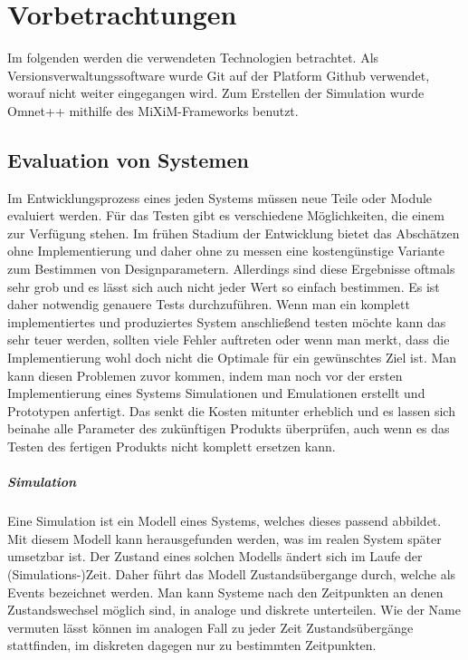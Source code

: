 \chapter{Vorbetrachtungen}

Im folgenden werden die verwendeten Technologien betrachtet. Als Versionsverwaltungssoftware wurde Git\cite{git} auf der Platform Github\cite{github} verwendet, worauf nicht weiter eingegangen wird. Zum Erstellen der Simulation wurde Omnet++\cite{omnet} mithilfe des MiXiM-Frameworks\cite{mixim} benutzt.

\section{Evaluation von Systemen}

Im Entwicklungsprozess eines jeden Systems müssen neue Teile oder Module evaluiert werden. Für das Testen gibt es verschiedene Möglichkeiten, die einem zur Verfügung stehen. Im frühen Stadium der Entwicklung bietet das Abschätzen ohne Implementierung und daher ohne zu messen eine kostengünstige Variante zum Bestimmen von Designparametern. Allerdings sind diese Ergebnisse oftmals sehr grob und es lässt sich auch nicht jeder Wert so einfach bestimmen. \newline
Es ist daher notwendig genauere Tests durchzuführen. Wenn man ein komplett implementiertes und produziertes System anschließend testen möchte kann das sehr teuer werden, sollten viele Fehler auftreten oder wenn man merkt, dass die Implementierung wohl doch nicht die Optimale für ein gewünschtes Ziel ist. \newline
Man kann diesen Problemen zuvor kommen, indem man noch vor der ersten Implementierung eines Systems Simulationen und Emulationen erstellt und Prototypen anfertigt. Das senkt die Kosten mitunter erheblich und es lassen sich beinahe alle Parameter des zukünftigen Produkts überprüfen, auch wenn es das Testen des fertigen Produkts nicht komplett ersetzen kann.

\paragraph{Simulation}

Eine Simulation ist ein Modell eines Systems, welches dieses passend abbildet. Mit diesem Modell kann herausgefunden werden, was im realen System später umsetzbar ist. Der Zustand eines solchen Modells ändert sich im Laufe der (Simulations-)Zeit. Daher führt das Modell Zustandsübergange durch, welche als Events bezeichnet werden. Man kann Systeme nach den Zeitpunkten an denen Zustandswechsel möglich sind, in analoge und diskrete unterteilen. Wie der Name vermuten lässt können im analogen Fall zu jeder Zeit Zustandsübergänge stattfinden, im diskreten dagegen nur zu bestimmten Zeitpunkten.

